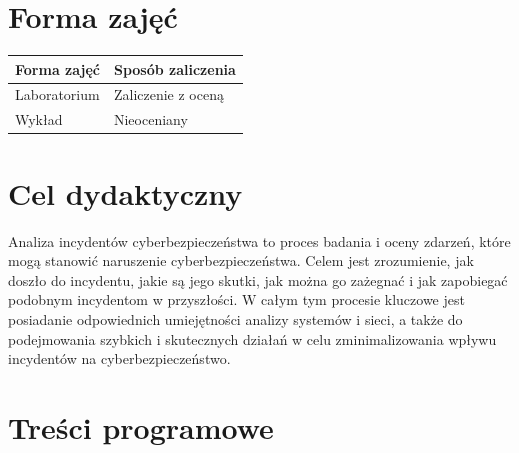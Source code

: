 \documentclass[12pt, a4paper]{article}
\begin{document}
\section{Forma zajęć}

\begin{tabular}{ll}
  \hline
  \textbf{Forma zajęć} & \textbf{Sposób zaliczenia} \\
  \hline
  Laboratorium & Zaliczenie z oceną \\
  Wykład & Nieoceniany \\
  \hline
\end{tabular}

\section{Cel dydaktyczny}

Analiza incydentów cyberbezpieczeństwa to proces badania i oceny zdarzeń, które mogą stanowić naruszenie cyberbezpieczeństwa. Celem jest zrozumienie, jak doszło do incydentu, jakie są jego skutki, jak można go zażegnać i jak zapobiegać podobnym incydentom w przyszłości. W całym tym procesie kluczowe jest posiadanie odpowiednich umiejętności analizy systemów i sieci, a także do podejmowania szybkich i skutecznych działań w celu zminimalizowania wpływu incydentów na cyberbezpieczeństwo.

\section{Treści programowe}
\end{document}
